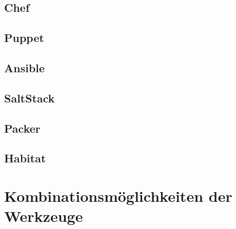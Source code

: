 
\label{lst:vagrant-bootstrap}

\label{lst:vagrantfile}

\subsection{Chef}
\label{sub:chef}

\subsection{Puppet}
\label{sub:puppet}

\subsection{Ansible}
\label{sub:ansible}

\subsection{SaltStack}
\label{sub:saltstack}

\subsection{Packer}
\label{sub:packer}

\subsection{Habitat}
\label{sub:habitat}


\section{Kombinationsmöglichkeiten der Werkzeuge}
\label{sec:werkzeugkombinationsmoeglichkeiten}
